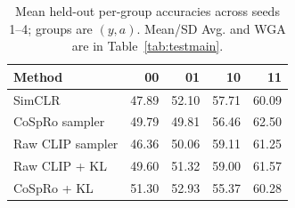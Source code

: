 \documentclass{article}
\begin{document}
\begin{table}[htbp]
\centering\small
\setlength{\tabcolsep}{4pt}
\caption{Mean held-out per-group accuracies across seeds 1--4; groups are $(y,a)$. Mean/SD Avg. and WGA are in Table~\ref{tab:testmain}.}
\begin{tabular}{lrrrr}
\toprule
Method & 00 & 01 & 10 & 11 \\
\midrule
SimCLR & 47.89 & 52.10 & 57.71 & 60.09 \\
CoSpRo sampler & 49.79 & 49.81 & 56.46 & 62.50 \\
Raw CLIP sampler & 46.36 & 50.06 & 59.11 & 61.25 \\
Raw CLIP + KL & 49.60 & 51.32 & 59.00 & 61.57 \\
CoSpRo + KL & 51.30 & 52.93 & 55.37 & 60.28 \\
\bottomrule
\end{tabular}
\label{tab:testgroups}
\end{table}
\end{document}
